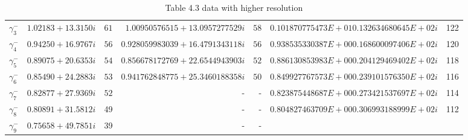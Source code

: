 \documentclass[a4paper]{article}
\begin{document}
\begin{table}
\begin{adjustbox}{width=1\textwidth}
\begin{tabular}{c | r | r | r | r | r | r }
 $\gamma_3^{-}$ & $ 1.02183  + 13.3150 i$ & $61  $&$1.00950576515 + 13.0957277529i $&$ 58 $ & $0.101870775473E+01  0.132634680645E+02i $& 122\\
 $\gamma_4^{-}$ &  $ 0.94250  + 16.9767 i$ &$ 56$  &$0.928059983039 +  16.4791343118i$& $56 $&$0.938535330387E+00  0.168600097406E+02i $& 120\\
 $\gamma_5^{-}$ &  $ 0.89075  + 20.6353 i$ &$ 54$  &$0.856678172769 +  22.6544943903i$ &$ 52$ &$0.886130853983E+00  0.204129469402E+02i$ &118 \\
 $\gamma_6^{-}$ &  $ 0.85490  + 24.2883 i$ &$ 53$  &$0.941762848775 +  25.3460188358i$ &$ 50$ & $0.849927767573E+00  0.239101576350E+02i$ & 116 \\
 $\gamma_7^{-}$ &  $ 0.82877  + 27.9369 i$ &$ 52$  &- & -& $0.823875448687E+00  0.273421537697E+02i$ & 114 \\
 $\gamma_8^{-}$ &  $ 0.80891  + 31.5812 i$ & 49  &- & -& $0.804827463709E+00  0.306993188999E+02i$ & 112 \\
 $\gamma_9^{-}$ &  $ 0.75658  + 49.7851 i$ & 39  &- & -& $$ & \\ \hline
 \end{tabular}
\end{adjustbox}
\caption{Table 4.3 data with higher resolution}
 \label{Table43_64}
\end{table}
\end{document}
